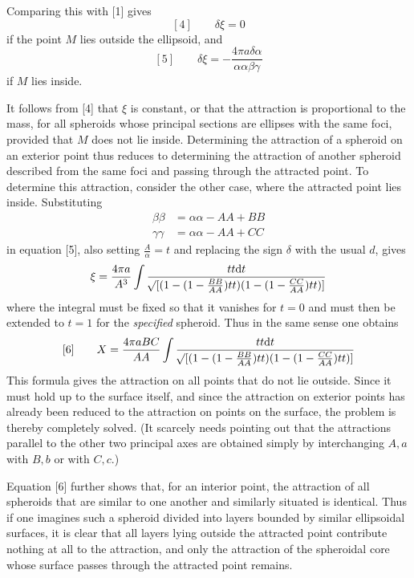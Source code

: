 Comparing this with [1] gives
\[
[4]\qquad\delta\xi=0
\]
if the point $M$ lies outside the ellipsoid, and
\[
[5]\qquad\delta\xi=-\frac{4\pi a\delta\alpha}{\alpha\alpha\beta\gamma}
\]
if $M$ lies inside.

It follows from [4] that $\xi$ is constant, or that the attraction is proportional to the mass, for all spheroids whose principal sections are ellipses with the same foci, provided that $M$ does not lie inside. Determining the attraction of a spheroid on an exterior point thus reduces to determining the attraction of another spheroid described from the same foci and passing through the attracted point. To determine this attraction, consider the other case, where the attracted point lies inside. Substituting
\[
\begin{aligned}
\beta\beta&=\alpha\alpha-AA+BB\\
\gamma\gamma&=\alpha\alpha-AA+CC
\end{aligned}
\]
in equation [5], also setting $\frac{A}{\alpha}=t$ and replacing the sign $\delta$ with the usual $d$, gives
\[
\xi=\frac{4\pi a}{A^3}\int\frac{tt\mathrm{d}t}{\mathord{{}^{}\!\surd}[(1-(1-\frac{BB}{AA})tt)(1-(1-\frac{CC}{AA})tt)]}
\]
where the integral must be fixed so that it vanishes for $t=0$ and must then be extended to $t=1$ for the \textit{specified} spheroid. Thus in the same sense one obtains
\[
[6]\qquad X=\frac{4\pi aBC}{AA}\int\frac{tt\mathrm{d}t}{\mathord{{}^{}\!\surd}[(1-(1-\frac{BB}{AA})tt)(1-(1-\frac{CC}{AA})tt)]}
\]
This formula gives the attraction on all points that do not lie outside. Since it must hold up to the surface itself, and since the attraction on exterior points has already been reduced to the attraction on points on the surface, the problem is thereby completely solved. (It scarcely needs pointing out that the attractions parallel to the other two principal axes are obtained simply by interchanging $A,a$ with $B,b$ or with $C,c$.)

Equation [6] further shows that, for an interior point, the attraction of all spheroids that are similar to one another and similarly situated is identical. Thus if one imagines such a spheroid divided into layers bounded by similar ellipsoidal surfaces, it is clear that all layers lying outside the attracted point contribute nothing at all to the attraction, and only the attraction of the spheroidal core whose surface passes through the attracted point remains.

